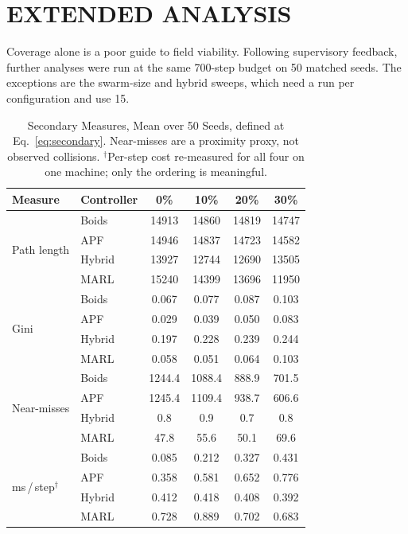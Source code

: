 \documentclass[a4paper, 10pt, conference]{ieeeconf}
\begin{document}
\section{EXTENDED ANALYSIS}\label{sec:extended}

Coverage alone is a poor guide to field viability. Following
supervisory feedback, further analyses were run at the same 700-step
budget on 50 matched seeds. The exceptions are the swarm-size and
hybrid sweeps, which need a run per configuration and use 15.

\begin{table}[htb]
\centering
\caption{Secondary Measures, Mean over 50 Seeds, defined at
Eq.~\ref{eq:secondary}. Near-misses are a proximity proxy, not
observed collisions. $^\dagger$Per-step cost re-measured for all four
on one machine; only the ordering is meaningful.}
\label{tab:extended}
\scriptsize
\setlength{\tabcolsep}{3pt}
\begin{tabular}{llcccc}
\toprule
\textbf{Measure} & \textbf{Controller} & \textbf{0\%} & \textbf{10\%} &
\textbf{20\%} & \textbf{30\%} \\
\midrule
\multirow{4}{*}{Path length}
 & Boids  & 14913 & 14860 & 14819 & 14747 \\
 & APF    & 14946 & 14837 & 14723 & 14582 \\
 & Hybrid & 13927 & 12744 & 12690 & 13505 \\
 & MARL   & 15240 & 14399 & 13696 & 11950 \\
\midrule
\multirow{4}{*}{Gini}
 & Boids  & 0.067 & 0.077 & 0.087 & 0.103 \\
 & APF    & 0.029 & 0.039 & 0.050 & 0.083 \\
 & Hybrid & 0.197 & 0.228 & 0.239 & 0.244 \\
 & MARL   & 0.058 & 0.051 & 0.064 & 0.103 \\
\midrule
\multirow{4}{*}{Near-misses}
 & Boids  & 1244.4 & 1088.4 & 888.9 & 701.5 \\
 & APF    & 1245.4 & 1109.4 & 938.7 & 606.6 \\
 & Hybrid & 0.8    & 0.9    & 0.7   & 0.8   \\
 & MARL   & 47.8   & 55.6   & 50.1  & 69.6  \\
\midrule
\multirow{4}{*}{ms\,/\,step$^\dagger$}
 & Boids  & 0.085 & 0.212 & 0.327 & 0.431 \\
 & APF    & 0.358 & 0.581 & 0.652 & 0.776 \\
 & Hybrid & 0.412 & 0.418 & 0.408 & 0.392 \\
 & MARL   & 0.728 & 0.889 & 0.702 & 0.683 \\
\bottomrule
\end{tabular}
\end{table}
\end{document}
